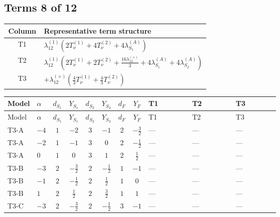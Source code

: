 \documentclass[8pt]{article}
\begin{document}
\begin{landscape}
\subsection*{Terms 8 of 12}
\begin{center}
\begin{tabular}{@{}c >{\raggedright\arraybackslash}p{0.82\linewidth}@{}}
\toprule
Column & Representative term structure \\
\midrule
T1 & \(\displaystyle {\lambda_{12}^{(1)}} (2 T_{\nu}^{(1)}+4 T_{\nu}^{(2)}+4 {\lambda_{S_1}^{(A)}})\) \\
\midrule
T2 & \(\displaystyle {\lambda_{12}^{(1)}} \left(2 T_{\nu}^{(1)}+2 T_{\nu}^{(2)}+\frac{16 {\lambda_{12}^{(\times)}}}{3}+4 {\lambda_{S_1}^{(A)}}+4 {\lambda_{S_2}^{(A)}}\right)\) \\
\midrule
T3 & \(\displaystyle +{\lambda_{12}^{(\times)}} \left(\frac{4}{3} T_{\nu}^{(1)}+\frac{4}{3} T_{\nu}^{(2)}\right)\) \\
\midrule
\bottomrule
\end{tabular}
\end{center}
\smallskip
\tiny
\begin{longtable}{@{}llcccccc >{\raggedright\arraybackslash}p{0.21\linewidth} >{\raggedright\arraybackslash}p{0.21\linewidth} >{\raggedright\arraybackslash}p{0.21\linewidth}@{}}
\toprule
Model & $\alpha$ & $d_{S_1}$ & $Y_{S_1}$ & $d_{S_2}$ & $Y_{S_2}$ & $d_F$ & $Y_F$ & T1 & T2 & T3 \\
\midrule
\endfirsthead
\toprule
Model & $\alpha$ & $d_{S_1}$ & $Y_{S_1}$ & $d_{S_2}$ & $Y_{S_2}$ & $d_F$ & $Y_F$ & T1 & T2 & T3 \\
\midrule
\endhead
T3-A & $-4$ & $1$ & $-2$ & $3$ & $-1$ & $2$ & $-\frac{3}{2}$ & --- & --- & --- \\
\midrule
T3-A & $-2$ & $1$ & $-1$ & $3$ & $0$ & $2$ & $-\frac{1}{2}$ & --- & --- & --- \\
\midrule
T3-A & $0$ & $1$ & $0$ & $3$ & $1$ & $2$ & $\frac{1}{2}$ & --- & --- & --- \\
\midrule
T3-B & $-3$ & $2$ & $-\frac{3}{2}$ & $2$ & $-\frac{1}{2}$ & $1$ & $-1$ & --- & --- & --- \\
\midrule
T3-B & $-1$ & $2$ & $-\frac{1}{2}$ & $2$ & $\frac{1}{2}$ & $1$ & $0$ & --- & --- & --- \\
\midrule
T3-B & $1$ & $2$ & $\frac{1}{2}$ & $2$ & $\frac{3}{2}$ & $1$ & $1$ & --- & --- & --- \\
\midrule
T3-C & $-3$ & $2$ & $-\frac{3}{2}$ & $2$ & $-\frac{1}{2}$ & $3$ & $-1$ & --- & --- & --- \\

\end{longtable}
\end{landscape}
\end{document}
